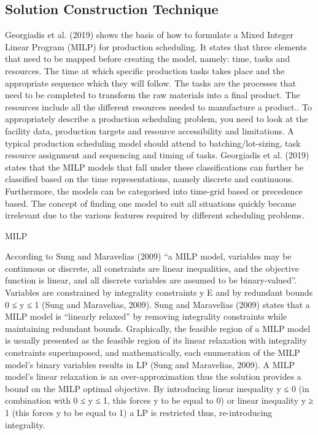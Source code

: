 \documentclass[a4paper,11pt,fleqn]{report}
\begin{document}
        \subsection{Solution Construction Technique}
                Georgiadis et al. (2019) shows the basis of how to formulate a Mixed Integer Linear Program (MILP) for production scheduling. It states that three elements that need to be mapped before creating the model, namely: time, tasks and resources. The time at which specific production tasks takes place and the appropriate sequence which they will follow. The tasks are the processes that need to be completed to transform the raw materials into a final product. The resources include all the different resources needed to manufacture a product.. To appropriately describe a production scheduling problem, you need to look at the facility data, production targets and resource accessibility and limitations. A typical production scheduling model should attend to batching/lot-sizing, task resource assignment and sequencing and timing of tasks.
                Georgiadis et al. (2019) states that the MILP models that fall under these classifications can further be classified based on the time representations, namely discrete and continuous. Furthermore, the models can be categorised into time-grid based or precedence based. The concept of finding one model to suit all situations quickly became irrelevant due to the various features required by different scheduling problems.
                
            MILP
            
                According to Sung and Maravelias (2009) “a MILP model, variables may be continuous or discrete, all constraints are linear inequalities, and the objective function is linear, and all discrete variables are assumed to be binary-valued”. Variables are constrained by integrality constraints y E and by redundant bounds 0 ≤ y ≤ 1 (Sung and Maravelias, 2009). Sung and Maravelias (2009) states that a MILP model is “linearly relaxed” by removing integrality constraints while maintaining redundant bounds. Graphically, the feasible region of a MILP model is usually presented as the feasible region of its linear relaxation with integrality constraints superimposed, and mathematically, each enumeration of the MILP model’s binary variables results in LP (Sung and Maravelias, 2009). A MILP model’s linear relaxation is an over-approximation thus the solution provides a bound on the MILP optimal objective. By introducing linear inequality y ≤ 0 (in combination with 0 ≤ y ≤ 1, this forces y to be equal to 0) or linear inequality y ≥ 1 (this forces y to be equal to 1) a LP is restricted thus, re-introducing integrality.
                
\end{document}
